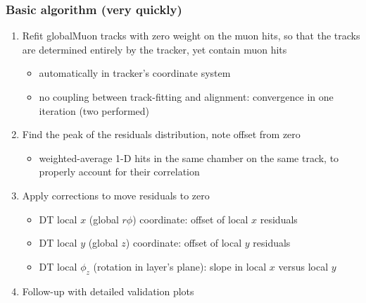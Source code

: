 \documentclass[compress]{beamer}
\begin{document}
\begin{frame}
\frametitle{Basic algorithm (very quickly)}

\begin{enumerate}
\item Refit globalMuon tracks with zero weight on the muon hits, so that the tracks are determined entirely by the tracker, yet contain muon hits
\begin{itemize}
\item automatically in tracker's coordinate system
\item no coupling between track-fitting and alignment: convergence in one iteration (two performed)
\end{itemize}

\item Find the peak of the residuals distribution, note offset from zero
\begin{itemize}
\item weighted-average 1-D hits in the same chamber on the same track, to properly account for their correlation
\end{itemize}

\item Apply corrections to move residuals to zero
\begin{itemize}
\item DT local $x$ (global $r\phi$) coordinate: offset of local $x$ residuals
\item DT local $y$ (global $z$) coordinate: offset of local $y$ residuals
\item DT local $\phi_z$ (rotation in layer's plane): slope in local $x$ versus local $y$
\end{itemize}

\item Follow-up with detailed validation plots
\end{enumerate}
\end{frame}
\end{document}
